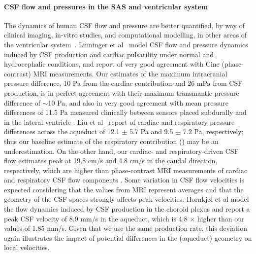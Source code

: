 \paragraph{CSF flow and pressures in the SAS and ventricular system}
The dynamics of human CSF flow and pressure are better quantified, by
way of clinical imaging, in-vitro studies, and computational
modelling, in other areas of the ventricular
system~\cite{linninger2007cerebrospinal, sweetman2011cerebrospinal,
  vinje2019respiratory, hornkjol2022csf, causemann2022human,
  karki2025real, liu2025transmantle}. Linninger et
al~\cite{linninger2007cerebrospinal} model CSF flow and pressure
dynamics induced by CSF production and cardiac pulsatility under
normal and hydrocephalic conditions, and report of very good agreement
with Cine (phase-contrast) MRI measurements. Our estimates of the
maximum intracranial pressure difference, 10 Pa from the cardiac
contribution and 26 mPa from CSF production, is in perfect agreement
with their maximum transmantle pressure difference of $\sim$10 Pa, and
also in very good agreement with mean pressure differences of 11.5 Pa
measured clinically between sensors placed subdurally and in the
lateral ventricle \cite{vinje2019respiratory}. Liu et
al~\cite{liu2025transmantle} report of cardiac and respiratory
pressure differences across the aqueduct of 12.1 $\pm$ 5.7 Pa and 9.5
$\pm$ 7.2 Pa, respectively; thus our baseline estimate of the
respiratory contribution () may be an
underestimation. On the other hand, our cardiac- and
respiratory-driven CSF flow estimates peak at 19.8 cm/s and 4.8 cm/s
in the caudal direction, respectively, which are higher than
phase-contrast MRI measurements of cardiac and respiratory CSF flow
components \cite{takizawa2017characterization,
  yildiz2017quantifying}. Some variation in CSF flow velocities is
expected considering that the values from MRI represent averages
\cite{yildiz2017quantifying} and that the geometry of the CSF spaces
strongly affects peak velocities\cite{vinje2019respiratory,
  causemann2022human}. Hornkjøl et al \cite{hornkjol2022csf} model the
flow dynamics induced by CSF production in the choroid plexus and
report a peak CSF velocity of 8.9 mm/s in the aqueduct, which is 4.8
$\times$ higher than our values of 1.85 mm/s. Given that we use the
same production rate, this deviation again illustrates the impact of
potential differences in the (aqueduct) geometry on local velocities.

